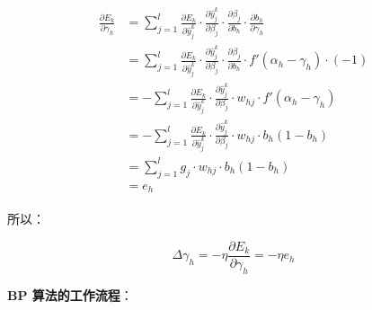 \documentclass[../studies-ml.tex]{subfiles}
\begin{document}
\begin{align*}
  \begin{split}
    \frac{\partial E_k}{\partial \gamma_h} & = \sum_{j=1}^{l} \frac{\partial E_k}{\partial \hat{y}_j^k} \cdot
    \frac{\partial \hat{y}_j^k}{\partial \beta_j} \cdot \frac{\partial \beta_j}{\partial b_h} \cdot
    \frac{\partial b_h}{\partial \gamma_h} \\
    & = \sum_{j=1}^{l} \frac{\partial E_k}{\partial \hat{y}_j^k} \cdot
    \frac{\partial \hat{y}_j^k}{\partial \beta_j} \cdot \frac{\partial \beta_j}{\partial b_h} \cdot
    f'(\alpha_h - \gamma_h) \cdot (-1) \\
    & = -\sum_{j=1}^{l} \frac{\partial E_k}{\partial \hat{y}_j^k} \cdot
    \frac{\partial \hat{y}_j^k}{\partial \beta_j} \cdot w_{hj} \cdot f'(\alpha_h - \gamma_h) \\
    & = -\sum_{j=1}^{l} \frac{\partial E_k}{\partial \hat{y}_j^k} \cdot
    \frac{\partial \hat{y}_j^k}{\partial \beta_j} \cdot w_{hj} \cdot b_h (1 - b_h) \\
    & = \sum_{j=1}^{l} g_j \cdot w_{hj} \cdot b_h (1 - b_h) \\
    & = e_h
  \end{split}
\end{align*}

所以：

\[
  \Delta \gamma_h = -\eta \frac{\partial E_k}{\partial \gamma_h} = -\eta e_h
\]

\newpage
\textbf{BP 算法的工作流程}：
\end{document}
